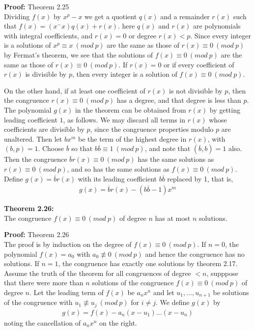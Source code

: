 \documentclass[a4paper]{article}
\begin{document}
\textbf{Proof:} Theorem 2.25\\
Dividing $f(x)$ by $x^p-x$ we get a quotient $q(x)$ and a remainder $r(x)$ such that $f(x)=(x^-x)q(x)+r(x)$. here $q(x)$ and $r(x)$ are polynomials with integral coefficients, and $r(x)=0$ or degree $r(x)<p$. Since every integer is a solutions of $x^p\equiv x\ (mod\ p)$ are the same as those of $r(x)\equiv 0\ (mod\ p)$ by Fermat's theorem, we see that the solutions of $f(x)\equiv 0\ (mod\ p)$ are the same as those of $r(x)\equiv 0\ (mod\ p)$. If $r(x)=0$ or if every coefficient of $r(x)$ is divisible by $p$, then every integer is a solution of $f(x)\equiv 0\ (mod\ p)$.

On the other hand, if at least one coefficient of $r(x)$ is not divisible by $p$, then the congruence $r(x)\equiv 0\ (mod\ p)$ has a degree, and that degree is  less than $p$. The polynomial $g(x)$ in the theorem can be obtained from $r(x)$ by getting leading coefficient $1$, as follows. We may discard all terms in $r(x)$ whose coefficients are divisible by $p$, since the congruence properties modulo $p$ are unaltered. Then let $bx^m$ be the term of the highest degree in $r(x)$, with $(b,p)=1$. Choose $\overline{b}$ so that $b\overline{b}\equiv 1\ (mod\ p)$, and note that $(\overline{b},b)=1$ also. Then the congruence $\overline{b}r(x)\equiv 0\ (mod\ p)$ has the same solutions as $r(x)\equiv 0\ (mod\ p)$, and so has the same solutions as $f(x)\equiv 0\ (mod\ p)$. Define $g(x)=\overline{b}r(x)$ with its leading coefficient $b\overline{b}$ replaced by 1, that is,
\begin{align}
    g(x)=\overline{b}r(x)-(b\overline{b}-1)x^m
\end{align}

\textbf{Theorem 2.26:}\\
The congruence $f(x)\equiv 0\ (mod\ p)$ of degree $n$ has at most $n$ solutions.

\textbf{Proof:} Theorem 2.26\\
The proof is by induction on the degree of $f(x)\equiv 0\ (mod\ p)$. If $n=0$, the polynomial $f(x)=a_0$ with $a_0\not\equiv 0\ (mod\ p)$ and hence the congruence has no solutions. If $n=1$, the congruence has exactly one solutions by theorem 2.17. Assume the truth of the theorem for all congruences of degree $<n$, supppose that there were more than $n$ solutions of the congruence $f(x)\equiv 0\ (mod\ p)$ of degree $n$. Let the leading term of $f(x)$ be $a_nx^n$ and let $u_1,...,u_{n+1}$ be solutions of the congruence with $u_1\not\equiv u_j\ (mod\ p)$ for $i\neq j$. We define $g(x)$ by
\begin{align}
    g(x)=f(x)-a_n(x-u_1)...(x-u_n)
\end{align}
noting the cancellation of $a_nx^n$ on the right.
\end{document}
